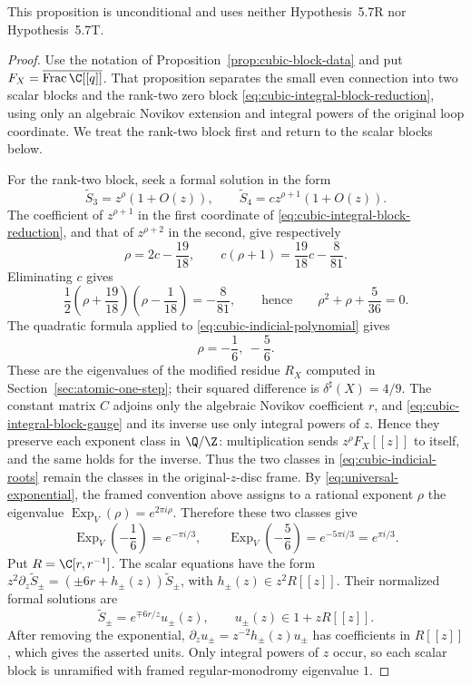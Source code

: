This proposition is unconditional and uses neither Hypothesis~5.7R nor
Hypothesis~5.7T.

\begin{proof}
Use the notation of Proposition~\ref{prop:cubic-block-data} and put
\(F_X=\overline{\operatorname{Frac}\C[[q]]}\).  That
proposition separates the small even connection into two scalar blocks and
the rank-two zero block \eqref{eq:cubic-integral-block-reduction}, using
only an algebraic Novikov extension and integral powers of the original
loop coordinate.  We treat the rank-two block first and return to the scalar
blocks below.

For the rank-two block, seek a formal solution in the form
\[
 \widetilde S_3=z^\rho(1+O(z)),
 \qquad
 \widetilde S_4=cz^{\rho+1}(1+O(z)).
 \label{eq:cubic-indicial-ansatz}
\]
The coefficient of \(z^{\rho+1}\) in the first coordinate of
\eqref{eq:cubic-integral-block-reduction}, and that of \(z^{\rho+2}\) in
the second, give respectively
\[
 \rho=2c-\frac{19}{18},
 \qquad
 c(\rho+1)=\frac{19}{18}c-\frac8{81}.
 \label{eq:cubic-indicial-coefficients}
\]
Eliminating \(c\) gives
\[
 \frac12\left(\rho+\frac{19}{18}\right)
 \left(\rho-\frac1{18}\right)=-\frac8{81},
 \qquad\text{hence}\qquad
 \rho^2+\rho+\frac5{36}=0.
 \label{eq:cubic-indicial-polynomial}
\]
The quadratic formula applied to \eqref{eq:cubic-indicial-polynomial} gives
\[
 \rho=-\frac16,\ -\frac56.
 \label{eq:cubic-indicial-roots}
\]
These are the eigenvalues of the modified residue \(R_X\) computed in
Section~\ref{sec:atomic-one-step}; their squared difference is
\(\delta^\sharp(X)=4/9\).
The constant matrix \(C\) adjoins only the algebraic Novikov coefficient
\(r\), and \eqref{eq:cubic-integral-block-gauge} and its inverse use only
integral powers of \(z\).  Hence they preserve each exponent class in
\(\Q/\Z\): multiplication sends \(z^\rho F_X[[z]]\) to itself, and the same
holds for the inverse.  Thus the two classes in
\eqref{eq:cubic-indicial-roots} remain the classes in the original-\(z\)-disc
frame.  By \eqref{eq:universal-exponential}, the framed convention above
assigns to a rational exponent \(\rho\) the eigenvalue
\(\operatorname{Exp}_V(\rho)=e^{2\pi i\rho}\).  Therefore these two classes
give
\[
 \operatorname{Exp}_V\left(-\frac16\right)=e^{-\pi i/3},
 \qquad
 \operatorname{Exp}_V\left(-\frac56\right)
 =e^{-5\pi i/3}=e^{\pi i/3}.
 \label{eq:cubic-framed-eigenvalues}
\]
Put \(R=\C[r,r^{-1}]\).  The scalar equations have the form
\(z^2\partial_z\widetilde S_\pm=(\pm6r+h_\pm(z))\widetilde S_\pm\), with
\(h_\pm(z)\in z^2R[[z]]\).  Their normalized formal solutions are
\[
 \widetilde S_\pm=e^{\mp6r/z}u_\pm(z),
 \qquad u_\pm(z)\in1+zR[[z]].
 \label{eq:cubic-rank-one-solutions}
\]
After removing the exponential,
\(\partial_zu_\pm=z^{-2}h_\pm(z)u_\pm\) has coefficients in \(R[[z]]\),
which gives the asserted units.  Only integral powers of \(z\) occur, so each
scalar block is unramified with framed regular-monodromy eigenvalue \(1\).


\end{proof}
